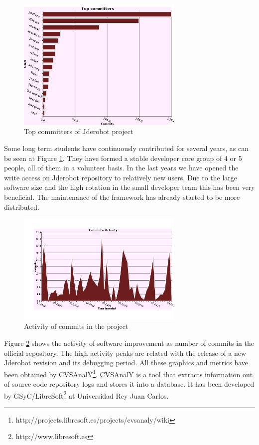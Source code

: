 \documentclass[twocolumn]{svjour3}          %
\begin{document}
\begin{figure}
\begin{center}
  \includegraphics[width=8cm]{figs/svn_top-committers.png}
\caption{Top committers of Jderobot project}
\end{center}
\label{fig:svn-topcommiters}
\end{figure}

Some long term students have continuously contributed for several years, as can be seen at Figure \ref{fig:svn-topcommiters}. They have formed a stable developer core group of 4 or 5 people, all of them in a volunteer basis. In the last years we have opened the write access on Jderobot repository to relatively new users. Due to the large software size and the high rotation in the small developer team this has been very beneficial. The maintenance of the framework has already started to be more distributed.

\begin{figure}
\begin{center}
  \includegraphics[width=8cm]{figs/svn_activity.png}
\caption{Activity of commits in the project}
\end{center}
\label{fig:svn-activity}
\end{figure}

Figure \ref{fig:svn-activity} shows the activity of software improvement as number of commits in the official repository. The high activity peaks are related with the release of a new Jderobot revision and its debugging period. All these graphics and metrics have been obtained by CVSAnalY\footnote{http://projects.libresoft.es/projects/cvsanaly/wiki}. CVSAnalY is a tool that extracts information out of source code repository logs and stores it into a database. It has been developed by GSyC/LibreSoft\footnote{http://www.libresoft.es} at Universidad Rey Juan Carlos.
\end{document}
